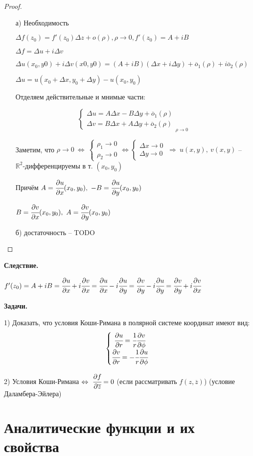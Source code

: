 \documentclass[draft]{report}
\newcommand{\forcenewline}{$\phantom{\mbox{newline}}$\newline}
\newcommand{\dd}{\partial}
\newcommand{\then}{\ \Rightarrow\ }
\newcommand{\R}{\mathbb{R}}
\newcommand{\LRA}{\Leftrightarrow}
\renewcommand{\bar}{\overline}
\renewcommand{\f}{\phi}
\newcommand{\D}{\Delta}
\newcommand{\z}{\bar{z}}
\renewcommand{\o}{\bar{o}}
\newcommand{\sys}[1]{\left\{\begin{matrix}#1\end{matrix}\right.}
\theoremstyle{remark}
\begin{document}
\begin{proof}
\forcenewline
\begin{itemize}
\item[а)] Необходимость

$\D f(z_0)=f'(z_0)\D z+o(\rho), \rho \to 0, f'(z_0)=A+iB$

$\D f=\D u+i\D v$

$\D u(x_0,y0)+i\D v(x0,y0)=(A+iB)(\D x+i\D y)+\o_1(\rho)+i\o_2(\rho)$

$\D u=u(x_0+\D x,y_0+\D y)-u(x_0,y_0)$

Отделяем действительные и мнимые части:

$$\sys{\D u=A\D x-B\D y+\o_1(\rho) \\ \D v=B\D x+A\D y+\o_2(\rho)}_{\rho\to 0}$$

Заметим, что $\rho\to 0\ \LRA\ \sys{\rho_1 \to 0 \\ \rho_2 \to 0} \LRA \sys{\D x\to 0 \\ \D y\to 0} \then u(x,y),\ v(x,y)$ -- $\R^2$-дифференцируемы в т. $(x_0,y_0)$

Причём $A=\cfrac{\dd u}{\dd x}(x_0,y_0),\ -B=\cfrac{\dd u}{\dd y}(x_0,y_0)$

$B=\cfrac{\dd v}{\dd x}(x_0,y_0),\ A=\cfrac{\dd v}{\dd y}(x_0,y_0)$

\item[б)] достаточность -- TODO

\end{itemize}
\end{proof}
{\bfseries Следствие.}

$f'(z_0)=A+iB=\cfrac{\dd u}{\dd x}+i\cfrac{\dd v}{\dd x}=\cfrac{\dd u}{\dd x}-i\cfrac{\dd u}{\dd y}=\cfrac{\dd v}{\dd y}-i\cfrac{\dd u}{\dd y}=\cfrac{\dd v}{\dd y}+i\cfrac{\dd v}{\dd x}$

{\bfseries Задачи.}

1) Доказать, что условия Коши-Римана в полярной системе координат имеют вид:
$$\sys{\cfrac{\dd u}{\dd r}=\cfrac 1r\cfrac{\dd v}{\dd \f} \\ \cfrac{\dd v}{\dd r}=-\cfrac 1r\cfrac{\dd u}{\dd \f}}$$

2) Условия Коши-Римана $\LRA\ \cfrac{\dd f}{\dd \z}=0$ (если рассматривать $f(z,\z)$) (условие Даламбера-Эйлера)

\section{Аналитические функции и их свойства}
\end{document}
